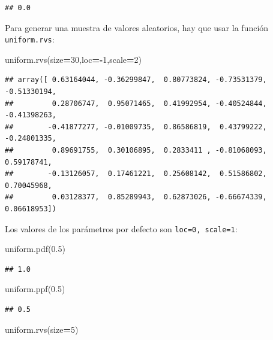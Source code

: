 \documentclass[]{book}
\newenvironment{Shaded}{\begin{snugshade}}{\end{snugshade}}
\newcommand{\DecValTok}[1]{\textcolor[rgb]{0.00,0.00,0.81}{#1}}
\newcommand{\FloatTok}[1]{\textcolor[rgb]{0.00,0.00,0.81}{#1}}
\newcommand{\NormalTok}[1]{#1}
\newcommand{\OperatorTok}[1]{\textcolor[rgb]{0.81,0.36,0.00}{\textbf{#1}}}
\begin{document}
\begin{verbatim}
## 0.0
\end{verbatim}

Para generar una muestra de valores aleatorios, hay que usar la función \texttt{uniform.rvs}:

\begin{Shaded}
\begin{Highlighting}[]
\NormalTok{uniform.rvs(size}\OperatorTok{=}\DecValTok{30}\NormalTok{,loc}\OperatorTok{=-}\DecValTok{1}\NormalTok{,scale}\OperatorTok{=}\DecValTok{2}\NormalTok{)}
\end{Highlighting}
\end{Shaded}

\begin{verbatim}
## array([ 0.63164044, -0.36299847,  0.80773824, -0.73531379, -0.51330194,
##         0.28706747,  0.95071465,  0.41992954, -0.40524844, -0.41398263,
##        -0.41877277, -0.01009735,  0.86586819,  0.43799222, -0.24801335,
##         0.89691755,  0.30106895,  0.2833411 , -0.81068093,  0.59178741,
##        -0.13126057,  0.17461221,  0.25608142,  0.51586802,  0.70045968,
##         0.03128377,  0.85289943,  0.62873026, -0.66674339,  0.06618953])
\end{verbatim}

Los valores de los parámetros por defecto son \texttt{loc=0,\ scale=1}:

\begin{Shaded}
\begin{Highlighting}[]
\NormalTok{uniform.pdf(}\FloatTok{0.5}\NormalTok{)}
\end{Highlighting}
\end{Shaded}

\begin{verbatim}
## 1.0
\end{verbatim}

\begin{Shaded}
\begin{Highlighting}[]
\NormalTok{uniform.ppf(}\FloatTok{0.5}\NormalTok{)}
\end{Highlighting}
\end{Shaded}

\begin{verbatim}
## 0.5
\end{verbatim}

\begin{Shaded}
\begin{Highlighting}[]
\NormalTok{uniform.rvs(size}\OperatorTok{=}\DecValTok{5}\NormalTok{)}
\end{Highlighting}
\end{Shaded}
\end{document}
